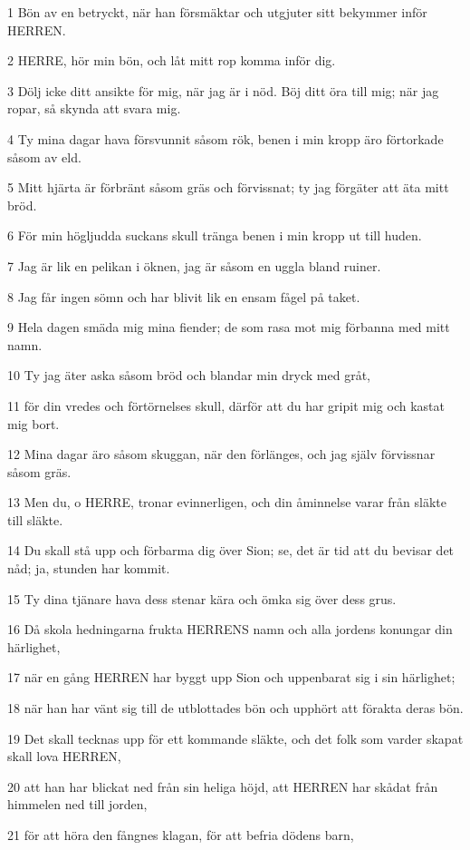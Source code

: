 \par 1 Bön av en betryckt, när han försmäktar och utgjuter sitt bekymmer inför HERREN.
\par 2 HERRE, hör min bön, och låt mitt rop komma inför dig.
\par 3 Dölj icke ditt ansikte för mig, när jag är i nöd. Böj ditt öra till mig; när jag ropar, så skynda att svara mig.
\par 4 Ty mina dagar hava försvunnit såsom rök, benen i min kropp äro förtorkade såsom av eld.
\par 5 Mitt hjärta är förbränt såsom gräs och förvissnat; ty jag förgäter att äta mitt bröd.
\par 6 För min högljudda suckans skull tränga benen i min kropp ut till huden.
\par 7 Jag är lik en pelikan i öknen, jag är såsom en uggla bland ruiner.
\par 8 Jag får ingen sömn och har blivit lik en ensam fågel på taket.
\par 9 Hela dagen smäda mig mina fiender; de som rasa mot mig förbanna med mitt namn.
\par 10 Ty jag äter aska såsom bröd och blandar min dryck med gråt,
\par 11 för din vredes och förtörnelses skull, därför att du har gripit mig och kastat mig bort.
\par 12 Mina dagar äro såsom skuggan, när den förlänges, och jag själv förvissnar såsom gräs.
\par 13 Men du, o HERRE, tronar evinnerligen, och din åminnelse varar från släkte till släkte.
\par 14 Du skall stå upp och förbarma dig över Sion; se, det är tid att du bevisar det nåd; ja, stunden har kommit.
\par 15 Ty dina tjänare hava dess stenar kära och ömka sig över dess grus.
\par 16 Då skola hedningarna frukta HERRENS namn och alla jordens konungar din härlighet,
\par 17 när en gång HERREN har byggt upp Sion och uppenbarat sig i sin härlighet;
\par 18 när han har vänt sig till de utblottades bön och upphört att förakta deras bön.
\par 19 Det skall tecknas upp för ett kommande släkte, och det folk som varder skapat skall lova HERREN,
\par 20 att han har blickat ned från sin heliga höjd, att HERREN har skådat från himmelen ned till jorden,
\par 21 för att höra den fångnes klagan, för att befria dödens barn,
